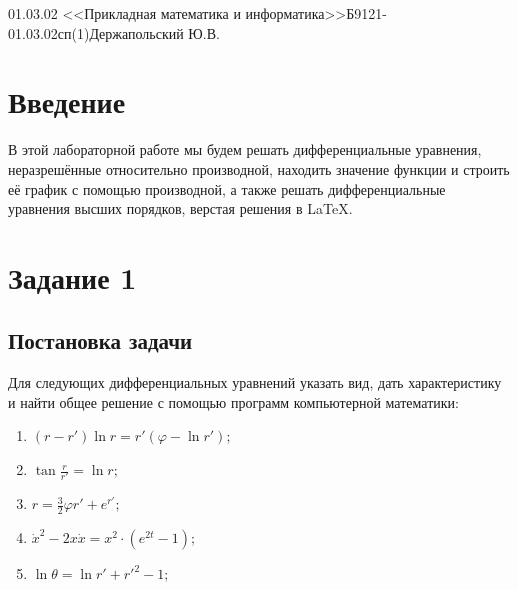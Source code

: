 \documentclass[14pt, a4paper, titlepage, fleqn]{extarticle}
\begin{document}
    {01.03.02 <<Прикладная математика и информатика>>}{Б9121-01.03.02сп(1)}{Держапольский Ю.В.}
    
    \tableofcontents

    \pagebreak

    \section{Введение}
        В этой лабораторной работе мы будем решать дифференциальные 
        уравнения, неразрешённые относительно производной, находить значение
        функции и строить её график с помощью производной, 
        а также решать дифференциальные уравнения высших
        порядков, верстая решения в \LaTeX.

    \pagebreak

    \section{Задание 1}
        \subsection{Постановка задачи}
            Для следующих дифференциальных уравнений указать вид,
            дать характеристику и найти общее решение с помощью программ
            компьютерной математики:

            \begin{enumerate}
                \item \( (r-r') \ln{r} = r' \left( \varphi - \ln{r'} \right); \)
                \item \( \tan{\frac{r}{r'}} = \ln{r}; \)
                \item \( r = \frac{3}{2} \varphi r' + e^{r'}; \)
                \item \( \dot{x}^2 - 2x \dot{x} = x^2 \cdot \left( e^{2t} - 1 \right); \)
                \item \( \ln{\theta} = \ln{r'} + r'^2 - 1; \)
            \end{enumerate}

        
\end{document}
